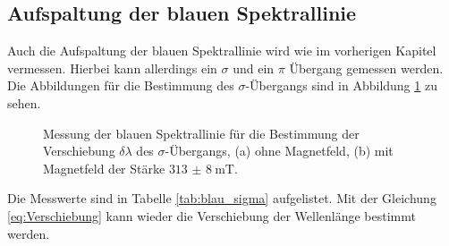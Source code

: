 \subsection{Aufspaltung der blauen Spektrallinie}
Auch die Aufspaltung der blauen Spektrallinie wird wie im vorherigen Kapitel vermessen.
Hierbei kann allerdings ein $\sigma$ und ein $\pi$ Übergang gemessen werden.
Die Abbildungen für die Bestimmung des $\sigma$-Übergangs sind in Abbildung \ref{fig:blau_sigma} zu sehen.
\FloatBarrier
\begin{figure}
    \centering
    \vspace{0.1\textwidth}
    \caption{Messung der blauen Spektrallinie für die Bestimmung der Verschiebung $\delta \lambda$ des $\sigma$-Übergangs, (a) ohne Magnetfeld, (b) mit Magnetfeld der Stärke $\SI{313(8)}{\milli\tesla}$.}
    \label{fig:blau_sigma}
\end{figure}
\FloatBarrier
Die Messwerte sind in Tabelle \ref{tab:blau_sigma} aufgelistet. Mit der Gleichung \eqref{eq:Verschiebung} kann wieder
die Verschiebung der Wellenlänge bestimmt werden.
